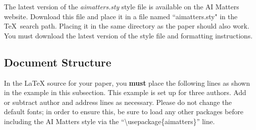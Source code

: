 \documentclass[letterpaper]{article}
\begin{document}
The latest version of the {\em aimatters.sty} style file is available on the AI Matters website. Download this file and place it in a file named ``aimatters.sty" in the \TeX\ search path. Placing it in the same directory as the paper should also work. You must download the latest version of the style file and formatting instructions.

\subsection{Document Structure}

In the \LaTeX{} source for your paper, you \textbf{must} place the following lines as shown in the example in this subsection. This example is set up for three authors. Add or subtract author and address lines as necessary. Please do not change the default fonts; in order to ensure this, be sure to load any other packages before including the AI Matters style via the ``\textbackslash usepackage\{aimatters\}'' line.
\end{document}
